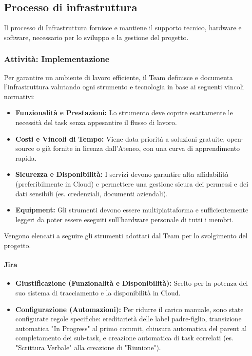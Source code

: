 \documentclass[a4paper,12pt]{article}
\begin{document}
\subsection{Processo di infrastruttura}
Il processo di Infrastruttura fornisce e mantiene il supporto tecnico, hardware e software, necessario per lo sviluppo e la gestione del progetto.

\subsubsection{Attività: Implementazione}\label{ImplementazioneInfrastruttura}
Per garantire un ambiente di lavoro efficiente, il Team definisce e documenta l'infrastruttura valutando ogni strumento e tecnologia in base ai seguenti vincoli normativi:
\begin{itemize}
    \item \textbf{Funzionalità e Prestazioni:} Lo strumento deve coprire esattamente le necessità del task senza appesantire il flusso di lavoro.
    \item \textbf{Costi e Vincoli di Tempo:} Viene data priorità a soluzioni gratuite, open-source o già fornite in licenza dall'Ateneo, con una curva di apprendimento rapida.
    \item \textbf{Sicurezza e Disponibilità:} I servizi devono garantire alta affidabilità (preferibilmente in Cloud) e permettere una gestione sicura dei permessi e dei dati sensibili (es. credenziali, documenti aziendali).
    \item \textbf{Equipment:} Gli strumenti devono essere multipiattaforma e sufficientemente leggeri da poter essere eseguiti sull'hardware personale di tutti i membri.
\end{itemize}
Vengono elencati a seguire gli strumenti adottati dal Team per lo svolgimento del progetto.

\paragraph{Jira} \label{Jira}
\begin{itemize}
    \item \textbf{Giustificazione (Funzionalità e Disponibilità):} Scelto per la potenza del suo sistema di tracciamento e la disponibilità in Cloud.
    \item \textbf{Configurazione (Automazioni):} Per ridurre il carico manuale, sono state configurate regole specifiche: ereditarietà delle label padre-figlio, transizione automatica "In Progress" al primo commit, chiusura automatica del parent al completamento dei sub-task, e creazione automatica di task correlati (es. "Scrittura Verbale" alla creazione di "Riunione").
\end{itemize}
\end{document}
